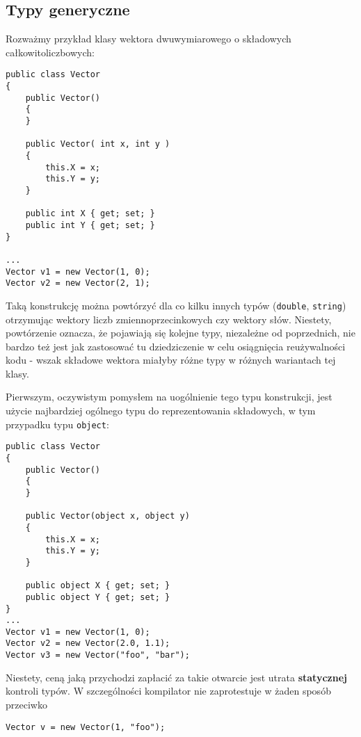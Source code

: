 ﻿\subsection{Typy generyczne}

Rozważmy przykład klasy wektora dwuwymiarowego o składowych całkowitoliczbowych:

\begin{scriptsize}
\begin{verbatim}
public class Vector
{
    public Vector()
    {
    }

    public Vector( int x, int y )
    {
        this.X = x;
        this.Y = y;
    }

    public int X { get; set; }
    public int Y { get; set; }
}

...
Vector v1 = new Vector(1, 0);
Vector v2 = new Vector(2, 1);
\end{verbatim}
\end{scriptsize}

Taką konstrukcję można powtórzyć dla co kilku innych typów ({\tt double}, {\tt string}) otrzymując wektory liczb
zmiennoprzecinkowych czy wektory słów. Niestety, powtórzenie oznacza, że pojawiają się kolejne typy, niezależne od poprzednich,
nie bardzo też jest jak zastosować tu dziedziczenie w celu osiągnięcia reużywalności kodu - wszak składowe wektora miałyby
różne typy w różnych wariantach tej klasy.

Pierwszym, oczywistym pomysłem na uogólnienie tego typu konstrukcji, jest użycie najbardziej ogólnego typu do
reprezentowania składowych, w tym przypadku typu {\tt object}:

\begin{scriptsize}
\begin{verbatim}
public class Vector
{
    public Vector()
    {
    }

    public Vector(object x, object y)
    {
        this.X = x;
        this.Y = y;
    }

    public object X { get; set; }
    public object Y { get; set; }
}
...
Vector v1 = new Vector(1, 0);
Vector v2 = new Vector(2.0, 1.1);
Vector v3 = new Vector("foo", "bar");
\end{verbatim}
\end{scriptsize}

Niestety, ceną jaką przychodzi zapłacić za takie otwarcie jest utrata {\bf statycznej} kontroli typów. W szczególności
kompilator nie zaprotestuje w żaden sposób przeciwko

\begin{scriptsize}
\begin{verbatim}
Vector v = new Vector(1, "foo");
\end{verbatim}
\end{scriptsize}

